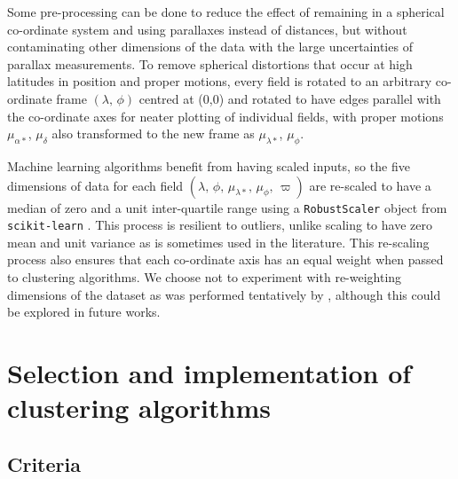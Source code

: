 Some pre-processing can be done to reduce the effect of remaining in a spherical co-ordinate system and using parallaxes instead of distances, but without contaminating other dimensions of the data with the large uncertainties of parallax measurements. To remove spherical distortions that occur at high latitudes in position and proper motions, every field is rotated to an arbitrary co-ordinate frame $(\lambda, \, \phi)$ centred at (0,0) and rotated to have edges parallel with the co-ordinate axes for neater plotting of individual fields, with proper motions $\mu_{\alpha*}$, $\mu_{\delta}$ also transformed to the new frame as $\mu_{\lambda*}$, $\mu_{\phi}$. 

Machine learning algorithms benefit from having scaled inputs, so the five dimensions of data for each field $(\lambda, \, \phi, \, \mu_{\lambda*}, \, \mu_{\phi}, \, \varpi)$ are re-scaled to have a median of zero and a unit inter-quartile range using a \texttt{RobustScaler} object from \texttt{scikit-learn} \citep{pedregosa_scikit-learn_2011}. This process is resilient to outliers, unlike scaling to have zero mean and unit variance as is sometimes used in the literature. This re-scaling process also ensures that each co-ordinate axis has an equal weight when passed to clustering algorithms. We choose not to experiment with re-weighting dimensions of the dataset as was performed tentatively by \cite{liu_catalog_2019}, although this could be explored in future works.



\section{Selection and implementation of clustering algorithms}\label{c2:sec:algorithms}
\subsection{Criteria}\label{c2:sec:algorithms_criteria}

